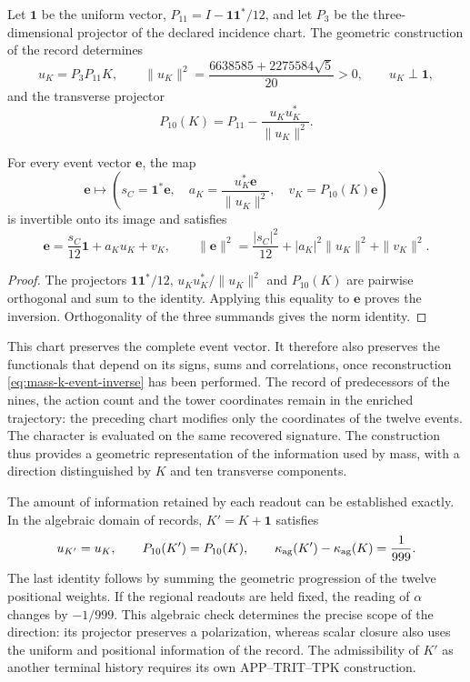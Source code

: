 Let \(\mathbf1\) be the uniform vector,
\(P_{11}=I-\mathbf1\mathbf1^*/12\), and let \(P_3\) be the
three-dimensional projector of the declared incidence chart. The geometric
construction of the record determines
\[
 u_K=P_3P_{11}K,\qquad
 \|u_K\|^2=\frac{6638585+2275584\sqrt5}{20}>0,
 \qquad u_K\perp\mathbf1,
\]
and the transverse projector
\[
 P_{10}(K)=P_{11}-\frac{u_Ku_K^*}{\|u_K\|^2}.
\]

\begin{proposition}
For every event vector \(\mathbf e\), the map
\begin{equation}
 \mathbf e\longmapsto
 \left(s_C=\mathbf1^*\mathbf e,\quad
       a_K=\frac{u_K^*\mathbf e}{\|u_K\|^2},\quad
       v_K=P_{10}(K)\mathbf e\right)
 \label{eq:mass-k-event-chart}
\end{equation}
is invertible onto its image and satisfies
\begin{equation}
 \mathbf e=\frac{s_C}{12}\mathbf1+a_Ku_K+v_K,
 \qquad
 \|\mathbf e\|^2=\frac{|s_C|^2}{12}
          +|a_K|^2\|u_K\|^2+\|v_K\|^2.
 \label{eq:mass-k-event-inverse}
\end{equation}
\end{proposition}
\begin{proof}
The projectors \(\mathbf1\mathbf1^*/12\),
\(u_Ku_K^*/\|u_K\|^2\) and \(P_{10}(K)\) are pairwise
orthogonal and sum to the identity. Applying this equality to \(\mathbf e\)
proves the inversion. Orthogonality of the three summands gives the
norm identity.
\end{proof}

This chart preserves the complete event vector. It therefore also preserves
the functionals that depend on its signs, sums and
correlations, once reconstruction
\eqref{eq:mass-k-event-inverse} has been performed. The record of predecessors of the nines,
the action count and the tower coordinates remain
in the enriched trajectory: the preceding chart modifies only
the coordinates of the twelve events. The character is evaluated on the same
recovered signature. The construction thus provides a geometric
representation of the information used by mass, with a direction
distinguished by \(K\) and ten transverse components.

The amount of information retained by each readout can be established
exactly. In the algebraic domain of records, \(K'=K+\mathbf1\)
satisfies
\[
 u_{K'}=u_K,\qquad P_{10}(K')=P_{10}(K),\qquad
 \kappa_{\rm ag}(K')-\kappa_{\rm ag}(K)=\frac1{999}.
\]
The last identity follows by summing the geometric progression of the
twelve positional weights. If the regional readouts are held
fixed, the reading of \(\alpha\) changes by \(-1/999\).
This algebraic check determines the precise scope of the direction:
its projector preserves a polarization, whereas scalar closure
also uses the uniform and positional information of the record.
The admissibility of \(K'\) as another terminal history requires its
own APP--TRIT--TPK construction.


